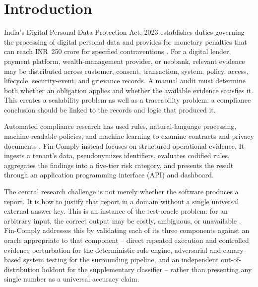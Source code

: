 \documentclass[11pt,a4paper]{article}
\newcommand{\system}{Fin-Comply}
\begin{document}
\section{Introduction}
India's Digital Personal Data Protection Act, 2023 establishes duties governing the processing of digital personal data and provides for monetary penalties that can reach INR~250 crore for specified contraventions \cite{dpdp}. For a digital lender, payment platform, wealth-management provider, or neobank, relevant evidence may be distributed across customer, consent, transaction, system, policy, access, lifecycle, security-event, and grievance records. A manual audit must determine both whether an obligation applies and whether the available evidence satisfies it. This creates a scalability problem as well as a traceability problem: a compliance conclusion should be linked to the records and logic that produced it.

Automated compliance research has used rules, natural-language processing, machine-readable policies, and machine learning to examine contracts and privacy documents \cite{hamdani,amaral,bonatti,chhetri}. \system{} instead focuses on structured operational evidence. It ingests a tenant's data, pseudonymizes identifiers, evaluates codified rules, aggregates the findings into a five-tier risk category, and presents the result through an application programming interface (API) and dashboard.

The central research challenge is not merely whether the software produces a report. It is how to justify that report in a domain without a single universal external answer key. This is an instance of the test-oracle problem: for an arbitrary input, the correct output may be costly, ambiguous, or unavailable \cite{barr}. \system{} addresses this by validating each of its three components against an oracle appropriate to that component -- direct repeated execution and controlled evidence perturbation for the deterministic rule engine, adversarial and canary-based system testing for the surrounding pipeline, and an independent out-of-distribution holdout for the supplementary classifier -- rather than presenting any single number as a universal accuracy claim.
\end{document}
